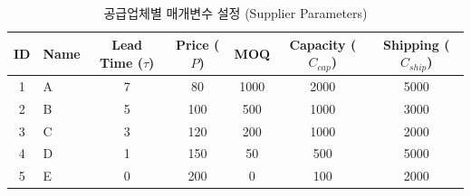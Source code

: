 \documentclass{article}
\begin{document}
\begin{table}[ht]
    \centering
    \caption{공급업체별 매개변수 설정 (Supplier Parameters)}
    \label{tab:supplier_info}
    \begin{tabular}{clccccc}
        \toprule
        \textbf{ID} & \textbf{Name} & \textbf{Lead Time ($\tau$)} & \textbf{Price ($P$)} & \textbf{MOQ} & \textbf{Capacity ($C_{cap}$)} & \textbf{Shipping ($C_{ship}$)} \\
        \midrule
        1 & A & 7 & 80 & 1000 & 2000 & 5000 \\
        2 & B & 5 & 100 & 500 & 1000 & 3000 \\
        3 & C & 3 & 120 & 200 & 1000 & 2000 \\
        4 & D & 1 & 150 & 50 & 500 & 5000 \\
        5 & E & 0 & 200 & 0 & 100 & 2000 \\
        \bottomrule
    \end{tabular}
\end{table}
\end{document}
